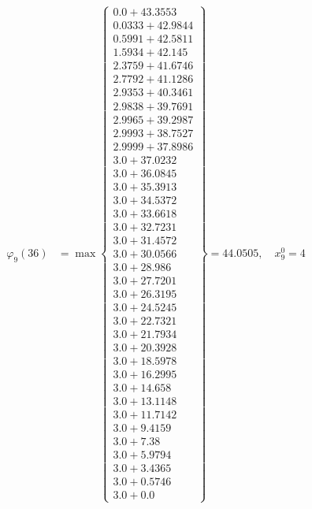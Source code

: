 \documentclass{article}
\begin{document}
\begin{align*}
  
\varphi_{9}(36) &= \max \left\{ \begin{array}{c}
0.0 + 43.3553 \\
 0.0333 + 42.9844 \\
 0.5991 + 42.5811 \\
 1.5934 + 42.145 \\
 2.3759 + 41.6746 \\
 2.7792 + 41.1286 \\
 2.9353 + 40.3461 \\
 2.9838 + 39.7691 \\
 2.9965 + 39.2987 \\
 2.9993 + 38.7527 \\
 2.9999 + 37.8986 \\
 3.0 + 37.0232 \\
 3.0 + 36.0845 \\
 3.0 + 35.3913 \\
 3.0 + 34.5372 \\
 3.0 + 33.6618 \\
 3.0 + 32.7231 \\
 3.0 + 31.4572 \\
 3.0 + 30.0566 \\
 3.0 + 28.986 \\
 3.0 + 27.7201 \\
 3.0 + 26.3195 \\
 3.0 + 24.5245 \\
 3.0 + 22.7321 \\
 3.0 + 21.7934 \\
 3.0 + 20.3928 \\
 3.0 + 18.5978 \\
 3.0 + 16.2995 \\
 3.0 + 14.658 \\
 3.0 + 13.1148 \\
 3.0 + 11.7142 \\
 3.0 + 9.4159 \\
 3.0 + 7.38 \\
 3.0 + 5.9794 \\
 3.0 + 3.4365 \\
 3.0 + 0.5746 \\
 3.0 + 0.0
\end{array} \right\}=44.0505,\quad x_{9}^0=4\\
  
  
\end{align*}
\end{document}

